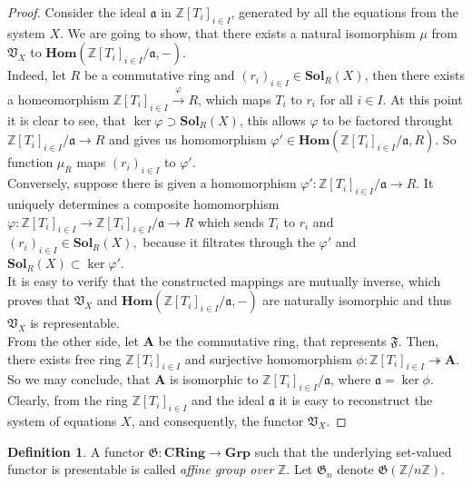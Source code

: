 \documentclass{article}
\theoremstyle{definition}
\theoremstyle{definition}
\newtheorem{definition}{Definition}
\begin{document}
\begin{proof}
Consider the ideal $\mathfrak{a}$ in $\mathbb{Z}[T_i]_{i \in I}$, generated by all the equations from the system $X$. We are going to show, that there exists a natural isomorphism $\mu$ from $\mathfrak{V}_X$ to $\mathbf{Hom}(\mathbb{Z}[T_i]_{i \in I}/\mathfrak{a}, -) $.\\
Indeed, let $R$ be a commutative ring and $(r_i)_{i\in I} \in \mathbf{Sol}_R(X)$, then there exists a homeomorphism $\mathbb{Z}[T_i]_{i\in I}\xrightarrow{\varphi} R$, which maps $T_i$ to $r_i$ for all $i \in I$. At this point it is clear to see, that $\operatorname{ker} \varphi \supset \mathbf{Sol}_R(X)$, this allows $\varphi$ to be factored throught $\mathbb{Z}[T_i]_{i\in I}/\mathfrak{a} \xrightarrow{} R$ and gives us homomorphism $\varphi '\in \mathbf{Hom}(\mathbb{Z}[T_i]_{i \in I}/\mathfrak{a}, R)$. So function $\mu_R$ maps $(r_i)_{i\in I}$ to $\varphi '$.\\
Conversely, suppose there is given a homomorphism $\varphi ': \mathbb{Z}[T_i]_{i\in I}/\mathfrak{a}\xrightarrow{} R$. It uniquely determines a composite homomorphism $\varphi : \mathbb{Z}[T_i]_{i\in I}\xrightarrow{}\mathbb{Z}[T_i]_{i\in I}/\mathfrak{a}\xrightarrow{} R$ which sends $T_i$ to $r_i$ and $(r_i)_{i\in I} \in\mathbf{Sol}_R(X),$ because it filtrates through the $\varphi '$ and $  \mathbf{Sol}_R(X) \subset \operatorname{ker} \varphi '$.\\
It is easy to verify that the constructed mappings are mutually inverse, which proves that $\mathfrak{V}_X$ and $\mathbf{Hom}(\mathbb{Z}[T_i]_{i \in I}/\mathfrak{a}, -) $ are naturally isomorphic and thus $\mathfrak{V}_X$ is representable.\\
From the other side, let $\mathbf{A}$ be the commutative ring, that represents $\mathfrak{F}.$ Then, there exists free ring $\mathbb{Z}[T_i]_{i \in I}$ and surjective homomorphism $\phi:\mathbb{Z}[T_i]_{i \in I}\twoheadrightarrow \mathbf{A}$. So we may conclude, that $\mathbf{A}$ is isomorphic to $\mathbb{Z}[T_i]_{i \in I}/\mathfrak{a}$, where $\mathfrak{a}=\operatorname{ker}\phi$. Clearly, from the ring $\mathbb{Z}[T_i]_{i\in I}$ and the ideal $\mathfrak{a}$ it is easy to reconstruct the system of equations $X$, and consequently, the functor $\mathfrak{V}_X.$
\end{proof}

\begin{definition}
    A functor $\mathfrak{G}:\mathbf{CRing}\xrightarrow{}\mathbf{Grp}$ such that the underlying set-valued functor is presentable is called \textit{affine group over} $\mathbb{Z}$.
    Let $\mathfrak{G}_n$ denote $\mathfrak{G}(\mathbb{Z}/n\mathbb{Z})$.
\end{definition}
\end{document}
